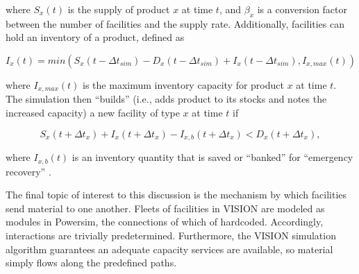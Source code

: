 where $S_x(t)$ is the supply of product $x$ at time $t$, and $\beta_x$ is a
conversion factor between the number of facilities and the supply
rate. Additionally, facilities can hold an inventory of a product, defined as

\begin{equation}
I_x(t) = min \left( S_x(t-\Delta t_{sim}) - D_x(t-\Delta t_{sim}) 
       + I_x(t-\Delta t_{sim}), I_{x,max}(t) \right)
\end{equation}

where $I_{x,max}(t)$ is the maximum inventory capacity for product $x$ at time
$t$. The simulation then ``builds'' (i.e., adds product to its stocks and notes
the increased capacity) a new facility of type $x$ at time $t$ if 

\begin{equation}
S_x(t + \Delta t_x) + I_x(t + \Delta t_x) - 
      I_{x,b}(t + \Delta t_x) < D_x(t + \Delta t_x),
\end{equation}

where $I_{x,b}(t)$ is an inventory quantity that is saved or ``banked'' for
``emergency recovery'' \cite{schweitzer_improved_2008}.

The final topic of interest to this discussion is the mechanism by which
facilities send material to one another. Fleets of facilities in VISION are
modeled as modules in Powersim, the connections of which of
hardcoded. Accordingly, interactions are trivially predetermined. Furthermore,
the VISION simulation algorithm guarantees an adequate capacity services are
available, so material simply flows along the predefined paths.
